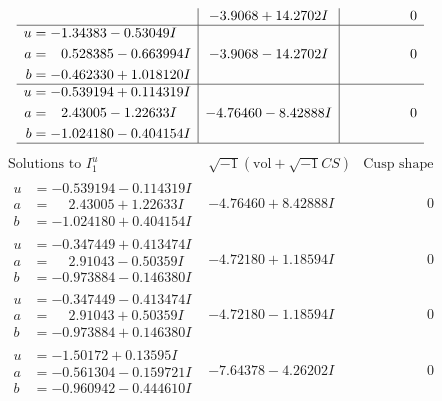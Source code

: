 \documentclass[1p]{elsarticle_modified}
\theoremstyle{definition}
\newcommand{\I}{\sqrt{-1}}
\begin{document}
$$\begin{array}{c|c|c}
 & -3.9068 + 14.2702 I & \phantom{-0.000000 } 0 \\ \hline\begin{aligned}
u &= -1.34383 - 0.53049 I \\
a &= \phantom{-}0.528385 - 0.663994 I \\
b &= -0.462330 + 1.018120 I\end{aligned}
 & -3.9068 - 14.2702 I & \phantom{-0.000000 } 0 \\ \hline\begin{aligned}
u &= -0.539194 + 0.114319 I \\
a &= \phantom{-}2.43005 - 1.22633 I \\
b &= -1.024180 - 0.404154 I\end{aligned}
 & -4.76460 - 8.42888 I & \phantom{-0.000000 } 0\\
 \hline 
 \end{array}$$\newpage$$\begin{array}{c|c|c}  
\text{Solutions to }I^u_{1}& \I (\text{vol} + \sqrt{-1}CS) & \text{Cusp shape}\\
 \hline 
\begin{aligned}
u &= -0.539194 - 0.114319 I \\
a &= \phantom{-}2.43005 + 1.22633 I \\
b &= -1.024180 + 0.404154 I\end{aligned}
 & -4.76460 + 8.42888 I & \phantom{-0.000000 } 0 \\ \hline\begin{aligned}
u &= -0.347449 + 0.413474 I \\
a &= \phantom{-}2.91043 - 0.50359 I \\
b &= -0.973884 - 0.146380 I\end{aligned}
 & -4.72180 + 1.18594 I & \phantom{-0.000000 } 0 \\ \hline\begin{aligned}
u &= -0.347449 - 0.413474 I \\
a &= \phantom{-}2.91043 + 0.50359 I \\
b &= -0.973884 + 0.146380 I\end{aligned}
 & -4.72180 - 1.18594 I & \phantom{-0.000000 } 0 \\ \hline\begin{aligned}
u &= -1.50172 + 0.13595 I \\
a &= -0.561304 - 0.159721 I \\
b &= -0.960942 - 0.444610 I\end{aligned}
 & -7.64378 - 4.26202 I & \phantom{-0.000000 } 0 \\ \hline\begin{aligned}

\end{aligned}
\end{array}$$
\end{document}
